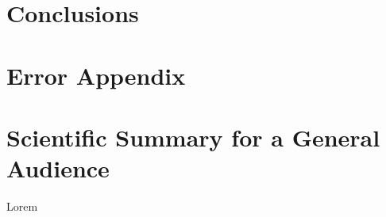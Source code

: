 \documentclass[10pt,twocolumn]{revtex4-2}    %
\begin{document}
 


\section{Conclusions}
 







\newpage

\section*{Error Appendix}



\clearpage

\onecolumngrid %

\section*{Scientific Summary for a General Audience}



Lorem 
\end{document}
